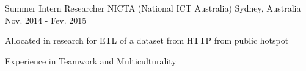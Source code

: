 \begin{cventries}
%
%

  \cventry
    {Summer Intern Researcher} %
    {NICTA (National ICT Australia)} %
    {Sydney, Australia} %
    {Nov. 2014 - Fev. 2015} %
    {
      \begin{cvitems} %
        \item {Allocated in research for ETL of a dataset from HTTP from public hotspot}
        \item {Experience in Teamwork and Multiculturality}
      \end{cvitems}
    }


\end{cventries}
